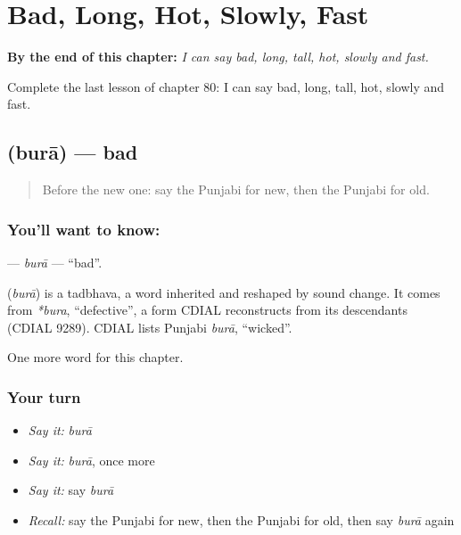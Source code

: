 
\chapter{Bad, Long, Hot, Slowly, Fast}
\label{ch:pa-bad-long-hot-slowly-fast}

\begin{chapteropening}
\textbf{By the end of this chapter:} \emph{I can say bad, long, tall, hot, slowly and fast.}

Complete the last lesson of chapter 80: I can say bad, long, tall, hot, slowly and fast.
\end{chapteropening}

\section[\texorpdfstring{\pa{ਬੁਰਾ} (burā)}{ਬੁਰਾ (burā)}]{ (burā) — bad}

\label{lesson:PA-C80-bura}



\begin{quote}
Before the new one: say the Punjabi for new, then the Punjabi for old.
\end{quote}

\subsection*{You'll want to know: }
\textbf{} — \emph{burā} — \textquotedblleft{}bad\textquotedblright{}.

\begin{cousinweb}
\textbf{} (\emph{burā}) is a tadbhava, a word inherited and reshaped by sound change. It comes from \emph{*bura}, \textquotedblleft{}defective\textquotedblright{}, a form CDIAL reconstructs from its descendants (CDIAL 9289). CDIAL lists Punjabi \emph{burā}, \textquotedblleft{}wicked\textquotedblright{}.
\end{cousinweb}

\begin{grammarlens}[title={What you've built}]
One more word for this chapter.
\end{grammarlens}

\subsection*{Your turn}
\begin{itemize}
\raggedright
  \item \emph{Say it:} \emph{burā}
  \item \emph{Say it:} \emph{burā}, once more
  \item \emph{Say it:} say \emph{burā}
  \item \emph{Recall:} say the Punjabi for new, then the Punjabi for old, then say \emph{burā} again
\end{itemize}

